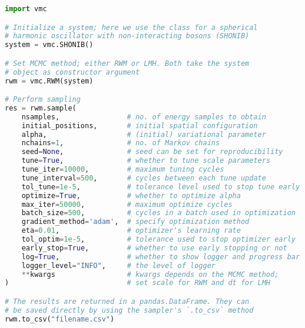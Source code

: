 \begin{lstlisting}[language=python]
import vmc

# Initialize a system; here we use the class for a spherical
# harmonic oscillator with non-interacting bosons (SHONIB)
system = vmc.SHONIB()

# Set MCMC method; either RWM or LMH. Both take the system
# object as constructor argument
rwm = vmc.RWM(system)

# Perform sampling
res = rwm.sample(
    nsamples,                # no. of energy samples to obtain
    initial_positions,       # initial spatial configuration
    alpha,                   # (initial) variational parameter
    nchains=1,               # no. of Markov chains
    seed=None,               # seed can be set for reproducibility
    tune=True,               # whether to tune scale parameters
    tune_iter=10000,         # maximum tuning cycles
    tune_interval=500,       # cycles between each tune update
    tol_tune=1e-5,           # tolerance level used to stop tune early
    optimize=True,           # whether to optimize alpha
    max_iter=50000,          # maximum optimize cycles
    batch_size=500,          # cycles in a batch used in optimization
    gradient_method='adam',  # specify optimization method
    eta=0.01,                # optimizer's learning rate
    tol_optim=1e-5,          # tolerance used to stop optimizer early
    early_stop=True,         # whether to use early stopping or not
    log=True,                # whether to show logger and progress bar
    logger_level="INFO",     # the level of logger
    **kwargs                 # kwargs depends on the MCMC method;
)                            # set scale for RWM and dt for LMH

# The results are returned in a pandas.DataFrame. They can
# be saved directly by using the sampler's `.to_csv` method
rwm.to_csv("filename.csv")

\end{lstlisting}

